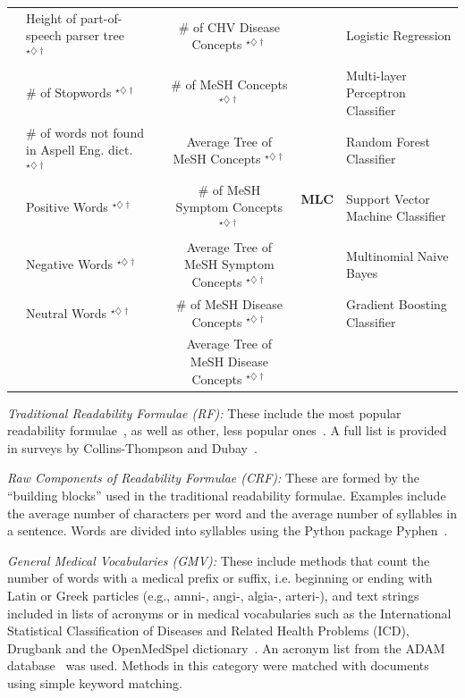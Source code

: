 \documentclass[10pt,a4paper]{article}
\begin{document}
\begin{table}[tb]
{\begin{tabular}{llccll}
			& Height of part-of-speech parser tree $^{\star\diamondsuit\dagger}$  &  & \# of CHV Disease Concepts $^{\star\diamondsuit\dagger}$  &  & Logistic Regression\tabularnewline
			\cline{3-6} 
			& \# of Stopwords $^{\star\diamondsuit\dagger}$  & \multirow{6}{*}{\textbf{\makecell{EMV}}}  & \# of MeSH Concepts $^{\star\diamondsuit\dagger}$  & \multirow{5}{*}{\textbf{MLC}}  & Multi-layer Perceptron Classifier\tabularnewline
			& \# of words not found in Aspell Eng. dict. $^{\star\diamondsuit\dagger}$ &  & Average Tree of MeSH Concepts $^{\star\diamondsuit\dagger}$  &  & Random Forest Classifier\tabularnewline
			& Positive Words $^{\star\diamondsuit\dagger}$  &  & \# of MeSH Symptom Concepts $^{\star\diamondsuit\dagger}$  &  & Support Vector Machine Classifier\tabularnewline
			& Negative Words $^{\star\diamondsuit\dagger}$ &  & Average Tree of MeSH Symptom Concepts $^{\star\diamondsuit\dagger}$  &  & Multinomial Naive Bayes\tabularnewline
			& Neutral Words $^{\star\diamondsuit\dagger}$  &  & \# of MeSH Disease Concepts $^{\star\diamondsuit\dagger}$  &  & Gradient Boosting Classifier\tabularnewline
			&  &  & Average Tree of MeSH Disease Concepts $^{\star\diamondsuit\dagger}$  &  & \tabularnewline
			\bottomrule 
	\end{tabular}} \vspace{-12pt}
	
\end{table}


\textit{Traditional Readability Formulae (RF):}
These include the most popular readability formulae~\cite{cli75,dale48,flesch75}, as well as other, less popular ones~\cite{ari67,gunning52,lix,smog69}. A full list is provided in surveys by Collins-Thompson \cite{collins2014computational} and Dubay~\cite{dubay04}.

\textit{Raw Components of Readability Formulae (CRF):}
These are formed by the ``building blocks'' used in the traditional readability formulae. Examples include the average number of characters per word and the average number of syllables in a sentence. Words are divided into syllables using the Python package Pyphen~\cite{pyphen}.

\textit{General Medical Vocabularies (GMV):}
These include methods that count the number of words with a medical prefix or suffix, i.e. beginning or ending with Latin or Greek particles (e.g., amni-, angi-, algia-, arteri-), and text strings included in lists of acronyms or in medical vocabularies such as the International Statistical Classification of Diseases and Related Health Problems (ICD), Drugbank and the OpenMedSpel dictionary~\cite{openmedspel}. An acronym list from the ADAM database~\cite{zhou2006} was used. Methods in this category were matched with documents using simple keyword matching. 
\end{document}
